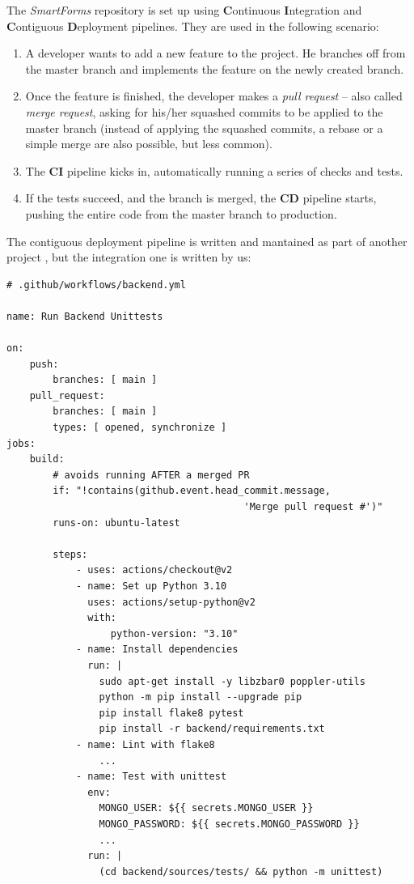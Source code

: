 \documentclass[11pt, a4paper]{report}
\begin{document}
The \textit{SmartForms} repository is set up using \textbf{C}ontinuous \textbf{I}ntegration and \textbf{C}ontiguous \textbf{D}eployment pipelines. They are used in the following scenario:
\begin{enumerate}
	\item A developer wants to add a new feature to the project. He branches off from the master branch and implements the feature on the newly created branch.
	\item Once the feature is finished, the developer makes a \textit{pull request} -- also called \textit{merge request}, asking for his/her squashed commits to be applied to the master branch (instead of applying the squashed commits, a rebase or a simple merge are also possible, but less common).
	\item The \textbf{CI} pipeline kicks in, automatically running a series of checks and tests.
	\item If the tests succeed, and the branch is merged, the \textbf{CD} pipeline starts, pushing the entire code from the master branch to production.
\end{enumerate}

The contiguous deployment pipeline is written and mantained as part of another project \cite{felix}, but the integration one is written by us:

\begin{verbatim}
# .github/workflows/backend.yml

name: Run Backend Unittests

on:
    push:
        branches: [ main ]
    pull_request:
        branches: [ main ]
        types: [ opened, synchronize ]
jobs:
    build:
        # avoids running AFTER a merged PR
        if: "!contains(github.event.head_commit.message,
                                         'Merge pull request #')"
        runs-on: ubuntu-latest

        steps:
            - uses: actions/checkout@v2
            - name: Set up Python 3.10
              uses: actions/setup-python@v2
              with:
                  python-version: "3.10"
            - name: Install dependencies
              run: |
                sudo apt-get install -y libzbar0 poppler-utils
                python -m pip install --upgrade pip
                pip install flake8 pytest
                pip install -r backend/requirements.txt
            - name: Lint with flake8
                ...
            - name: Test with unittest
              env:
                MONGO_USER: ${{ secrets.MONGO_USER }} 
                MONGO_PASSWORD: ${{ secrets.MONGO_PASSWORD }}
                ...
              run: |
                (cd backend/sources/tests/ && python -m unittest)
\end{verbatim}
\end{document}

